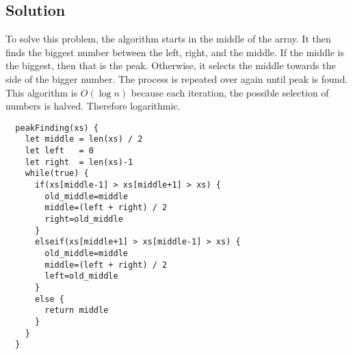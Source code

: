 \subsection*{Solution}
To solve this problem, the algorithm starts in the middle of the array. It then finds the biggest number between the left, right, and the middle. If the middle is the biggest, then that is the peak. Otherwise, it selects the middle towards the side of the bigger number. The process is repeated over again until peak is found.
This algorithm is $O(\log n)$ because each iteration, the possible selection of numbers is halved. Therefore logarithmic.

\begin{verbatim}
  peakFinding(xs) {
    let middle = len(xs) / 2
    let left   = 0
    let right  = len(xs)-1
    while(true) {
      if(xs[middle-1] > xs[middle+1] > xs) {
        old_middle=middle
        middle=(left + right) / 2
        right=old_middle
      }
      elseif(xs[middle+1] > xs[middle-1] > xs) {
        old_middle=middle
        middle=(left + right) / 2
        left=old_middle
      }
      else {
        return middle
      }
    }
  }
\end{verbatim}
